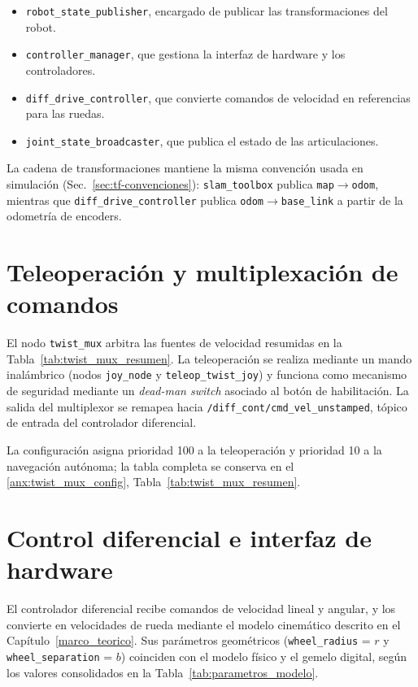 \begin{itemize}
\item \texttt{robot\_state\_publisher}, encargado de publicar las transformaciones del robot.
\item \texttt{controller\_manager}, que gestiona la interfaz de hardware y los controladores.
\item \texttt{diff\_drive\_controller}, que convierte comandos de velocidad en referencias para las ruedas.
\item \texttt{joint\_state\_broadcaster}, que publica el estado de las articulaciones.
\end{itemize}

La cadena de transformaciones mantiene la misma convención usada en simulación (Sec.~\ref{sec:tf-convenciones}): \texttt{slam\_toolbox} publica \texttt{map}$\rightarrow$\texttt{odom}, mientras que \texttt{diff\_drive\_controller} publica \texttt{odom}$\rightarrow$\texttt{base\_link} a partir de la odometría de encoders.

\section{Teleoperación y multiplexación de comandos}

El nodo \texttt{twist\_mux} arbitra las fuentes de velocidad resumidas en la Tabla~\ref{tab:twist_mux_resumen}. La teleoperación se realiza mediante un mando inalámbrico (nodos \texttt{joy\_node} y \texttt{teleop\_twist\_joy}) y funciona como mecanismo de seguridad mediante un \textit{dead-man switch} asociado al botón de habilitación. La salida del multiplexor se remapea hacia \texttt{/diff\_cont/cmd\_vel\_unstamped}, tópico de entrada del controlador diferencial.

La configuración asigna prioridad 100 a la teleoperación y prioridad 10 a la navegación autónoma; la tabla completa se conserva en el \ref{anx:twist_mux_config}, Tabla~\ref{tab:twist_mux_resumen}.

\section{Control diferencial e interfaz de hardware}
\label{sec:diff_drive_params}

El controlador diferencial recibe comandos de velocidad lineal y angular, y los convierte en velocidades de rueda mediante el modelo cinemático descrito en el Capítulo~\ref{marco_teorico}. Sus parámetros geométricos (\texttt{wheel\_radius} = $r$ y \texttt{wheel\_separation} = $b$) coinciden con el modelo físico y el gemelo digital, según los valores consolidados en la Tabla~\ref{tab:parametros_modelo}.

